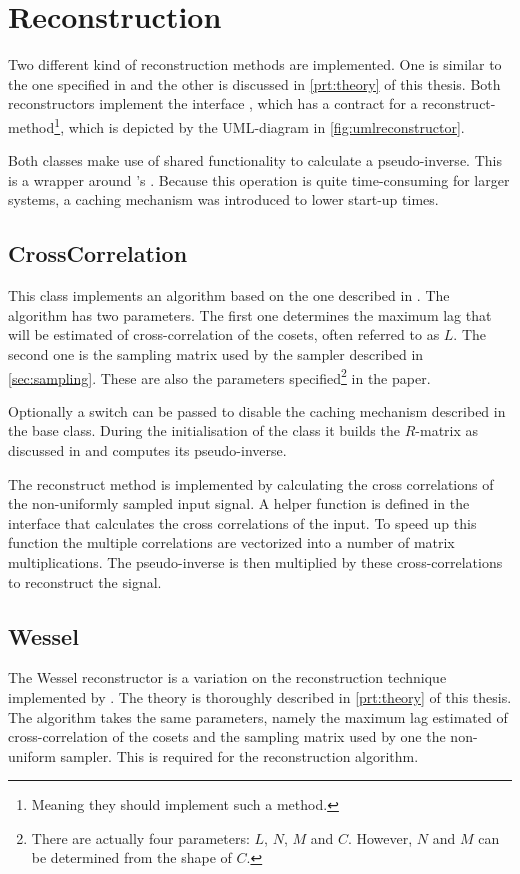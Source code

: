 \documentclass[a4paper, openany, oneside]{memoir}
\begin{document}
\section{Reconstruction}
\label{sec:reconstruction}
Two different kind of reconstruction methods are implemented. One is similar to the one specified in \cite{ariananda2012compressive} and the other is discussed in \cref{prt:theory} of this thesis. Both reconstructors implement the interface , which has a contract for a reconstruct-method\footnote{Meaning they should implement such a method.}, which is depicted by the UML-diagram in \cref{fig:umlreconstructor}.

Both classes make use of shared functionality to calculate a pseudo-inverse. This is a wrapper around 's . Because this operation is quite time-consuming for larger systems, a caching mechanism was introduced to lower start-up times.

\subsection{CrossCorrelation}
\label{sub:crosscorrelation}
This class implements an algorithm based on the one described in \cite{ariananda2012compressive}. The algorithm has two parameters. The first one determines the maximum lag that will be estimated of cross-correlation of the cosets, often referred to as $L$. The second one is the sampling matrix used by the sampler described in \cref{sec:sampling}. These are also the parameters specified\footnote{\label{fn:reconparam}There are actually four parameters: $L$, $N$, $M$ and $C$. However, $N$ and $M$ can be determined from the shape of $C$.} in the paper.

Optionally a switch can be passed to disable the caching mechanism described in the base class. During the initialisation of the class it builds the $R$-matrix as discussed in \cite{ariananda2012compressive} and computes its pseudo-inverse.

The reconstruct method is implemented by calculating the cross correlations of the non-uniformly sampled input signal. A helper function is defined in the  interface that calculates the cross correlations of the input. To speed up this function the multiple correlations are vectorized into a number of matrix multiplications. The pseudo-inverse is then multiplied by these cross-correlations to reconstruct the signal.

\subsection{Wessel}
\label{sub:wessel}
The Wessel reconstructor is a variation on the reconstruction technique implemented by . The theory is thoroughly described in \cref{prt:theory} of this thesis. The algorithm takes the same parameters, namely the maximum lag estimated of cross-correlation of the cosets and the sampling matrix used by one the non-uniform sampler. This is required for the reconstruction algorithm.
\end{document}
